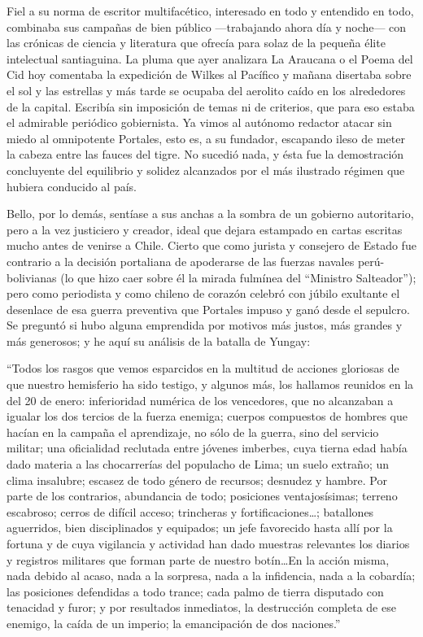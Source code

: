 \documentclass[10pt,twoside,openright]{memoir}
\begin{document}
Fiel a su norma de escritor multifacético, interesado en todo y
entendido en todo, combinaba sus campañas de bien público ---trabajando
ahora día y noche--- con las crónicas de ciencia y literatura que
ofrecía para solaz de la pequeña élite intelectual santiaguina. La pluma
que ayer analizara La Araucana o el Poema del Cid hoy comentaba la
expedición de Wilkes al Pacífico y mañana disertaba sobre el sol y las
estrellas y más tarde se ocupaba del aerolito caído en los alrededores
de la capital. Escribía sin imposición de temas ni de criterios, que
para eso estaba el admirable periódico gobiernista. Ya vimos al autónomo
redactor atacar sin miedo al omnipotente Portales, esto es, a su
fundador, escapando ileso de meter la cabeza entre las fauces del tigre.
No sucedió nada, y ésta fue la demostración concluyente del equilibrio y
solidez alcanzados por el más ilustrado régimen que hubiera conducido al
país.

Bello, por lo demás, sentíase a sus anchas a la sombra de un gobierno
autoritario, pero a la vez justiciero y creador, ideal que dejara
estampado en cartas escritas mucho antes de venirse a Chile. Cierto que
como jurista y consejero de Estado fue contrario a la decisión
portaliana de apoderarse de las fuerzas navales perú-bolivianas (lo que
hizo caer sobre él la mirada fulmínea del ``Ministro Salteador''); pero
como periodista y como chileno de corazón celebró con júbilo exultante
el desenlace de esa guerra preventiva que Portales impuso y ganó desde
el sepulcro. Se preguntó si hubo alguna emprendida por motivos más
justos, más grandes y más generosos; y he aquí su análisis de la batalla
de Yungay:

``Todos los rasgos que vemos esparcidos en la multitud de acciones
gloriosas de que nuestro hemisferio ha sido testigo, y algunos más, los
hallamos reunidos en la del 20 de enero: inferioridad numérica de los
vencedores, que no alcanzaban a igualar los dos tercios de la fuerza
enemiga; cuerpos compuestos de hombres que hacían en la campaña el
aprendizaje, no sólo de la guerra, sino del servicio militar; una
oficialidad reclutada entre jóvenes imberbes, cuya tierna edad había
dado materia a las chocarrerías del populacho de Lima; un suelo extraño;
un clima insalubre; escasez de todo género de recursos; desnudez y
hambre. Por parte de los contrarios, abundancia de todo; posiciones
ventajosísimas; terreno escabroso; cerros de difícil acceso; trincheras
y fortificaciones\ldots; batallones aguerridos, bien disciplinados y
equipados; un jefe favorecido hasta allí por la fortuna y de cuya
vigilancia y actividad han dado muestras relevantes los diarios y
registros militares que forman parte de nuestro botín\ldots En la acción
misma, nada debido al acaso, nada a la sorpresa, nada a la infidencia,
nada a la cobardía; las posiciones defendidas a todo trance; cada palmo
de tierra disputado con tenacidad y furor; y por resultados inmediatos,
la destrucción completa de ese enemigo, la caída de un imperio; la
emancipación de dos naciones.''
\end{document}
